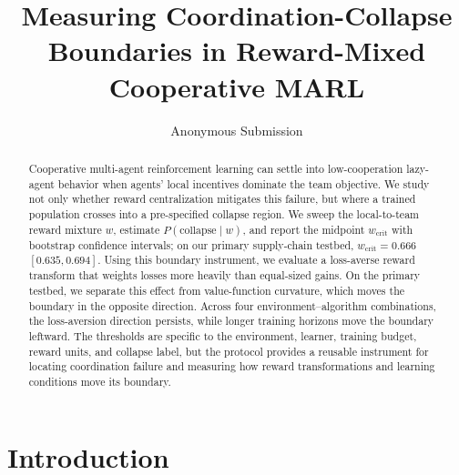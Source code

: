\documentclass[letterpaper]{article} %
\title{Measuring Coordination-Collapse Boundaries in Reward-Mixed Cooperative MARL}
\author{
  Anonymous Submission
}
\theoremstyle{plain}
\newcommand{\wcrit}{w_{\mathrm{crit}}}
\begin{document}
\maketitle

\begin{abstract}
Cooperative multi-agent reinforcement learning can settle into low-cooperation lazy-agent behavior when
agents' local incentives dominate the team objective. We study not only whether reward centralization
mitigates this failure, but where a trained population crosses into a pre-specified collapse region.
We sweep the local-to-team reward mixture $w$, estimate $P(\mathrm{collapse}\mid w)$, and report the
midpoint $\wcrit$ with bootstrap confidence intervals; on our primary supply-chain testbed,
$\wcrit=0.666$ $[0.635,0.694]$. Using this boundary instrument, we evaluate a loss-averse reward
transform that weights losses more heavily than equal-sized gains. On the primary testbed, we separate
this effect from value-function curvature, which moves the boundary in the opposite direction. Across
four environment--algorithm combinations, the loss-aversion direction persists, while longer training
horizons move the boundary leftward. The thresholds are specific to the environment, learner, training
budget, reward units, and collapse label, but the protocol provides a reusable instrument for locating
coordination failure and measuring how reward transformations and learning conditions move its boundary.
\end{abstract}

\section{Introduction}
\label{sec:intro}
\end{document}
